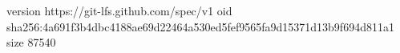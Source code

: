 version https://git-lfs.github.com/spec/v1
oid sha256:4a691f3b4dbc4188ae69d22464a530ed5fef9565fa9d15371d13b9f694d811a1
size 87540

